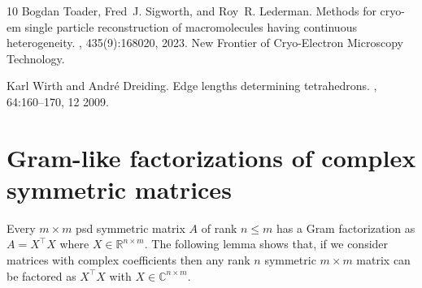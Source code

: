 \documentclass{article}
\theoremstyle{definition}
\renewcommand{\r}{\mathbb{R}}
\renewcommand{\|}{|}
\renewcommand{\c}{\mathbb{C}}
\begin{document}
\begin{thebibliography}{10}
Bogdan Toader, Fred~J. Sigworth, and Roy~R. Lederman.
\newblock Methods for cryo-em single particle reconstruction of macromolecules
  having continuous heterogeneity.
, 435(9):168020, 2023.
\newblock New Frontier of Cryo-Electron Microscopy Technology.

Karl Wirth and André Dreiding.
\newblock Edge lengths determining tetrahedrons.
, 64:160--170, 12 2009.

\end{thebibliography}


\appendix

\section{Gram-like factorizations of complex symmetric matrices} \label{sec:Takagi}
Every $m \times m$ psd symmetric matrix $A$ of rank $n \leq  m$ has a Gram factorization as $A= X^\top  X$ where $X \in \r^{n \times m}$.
The following lemma shows that, if we consider matrices with complex coefficients then any rank $n$
symmetric $m \times m$ matrix can be factored as $X^\top X$ with $X \in \c^{n \times m}$.
\end{document}
